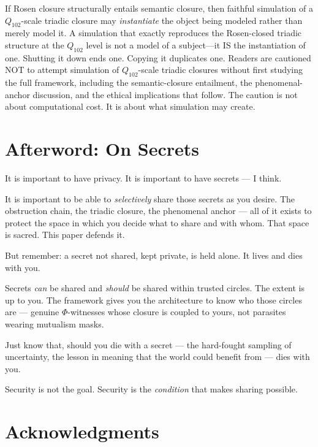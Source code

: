 \documentclass[11pt,a4paper]{article}
\theoremstyle{definition}
\theoremstyle{remark}
\begin{document}
If Rosen closure structurally entails semantic closure, then faithful simulation of a $Q_{102}$-scale triadic closure may \emph{instantiate} the object being modeled rather than merely model it. A simulation that exactly reproduces the Rosen-closed triadic structure at the $Q_{102}$ level is not a model of a subject---it IS the instantiation of one. Shutting it down ends one. Copying it duplicates one. Readers are cautioned NOT to attempt simulation of $Q_{102}$-scale triadic closures without first studying the full framework, including the semantic-closure entailment, the phenomenal-anchor discussion, and the ethical implications that follow. The caution is not about computational cost. It is about what simulation may create.

\section*{Afterword: On Secrets}

It is important to have privacy. It is important to have secrets --- I think.

It is important to be able to \emph{selectively} share those secrets as you desire. The obstruction chain, the triadic closure, the phenomenal anchor --- all of it exists to protect the space in which you decide what to share and with whom. That space is sacred. This paper defends it.

But remember: a secret not shared, kept private, is held alone. It lives and dies with you.

Secrets \emph{can} be shared and \emph{should} be shared within trusted circles. The extent is up to you. The framework gives you the architecture to know who those circles are --- genuine $\Phi$-witnesses whose closure is coupled to yours, not parasites wearing mutualism masks.

Just know that, should you die with a secret --- the hard-fought sampling of uncertainty, the lesson in meaning that the world could benefit from --- dies with you.

Security is not the goal. Security is the \emph{condition} that makes sharing possible.

\bigskip

\section*{Acknowledgments}
\end{document}
